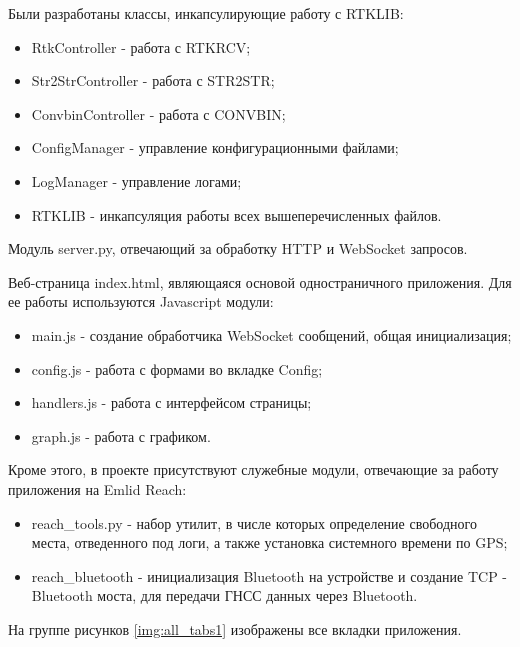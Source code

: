Были разработаны классы, инкапсулирующие работу с RTKLIB:

\begin{itemize}
  \item RtkController - работа с RTKRCV;
  \item Str2StrController - работа с STR2STR;
  \item ConvbinController - работа с CONVBIN;
  \item ConfigManager - управление конфигурационными файлами;
  \item LogManager - управление логами;
  \item RTKLIB - инкапсуляция работы всех вышеперечисленных файлов.
\end{itemize}

Модуль server.py, отвечающий за обработку HTTP и WebSocket запросов.

Веб-страница index.html, являющаяся основой одностраничного приложения. Для ее работы используются Javascript модули:

\begin{itemize}
  \item main.js - создание обработчика WebSocket сообщений, общая инициализация;
  \item config.js - работа с формами во вкладке Config;
  \item handlers.js - работа с интерфейсом страницы;
  \item graph.js - работа с графиком.
\end{itemize}

Кроме этого, в проекте присутствуют служебные модули, отвечающие за работу приложения на Emlid Reach:

\begin{itemize}
  \item reach\_tools.py - набор утилит, в числе которых определение свободного места, отведенного под логи, а также установка системного времени по GPS;
  \item reach\_bluetooth - инициализация Bluetooth на устройстве и создание TCP - Bluetooth моста, для передачи ГНСС данных через Bluetooth.
\end{itemize}

На группе рисунков \ref{img:all_tabs1} изображены все вкладки приложения.

